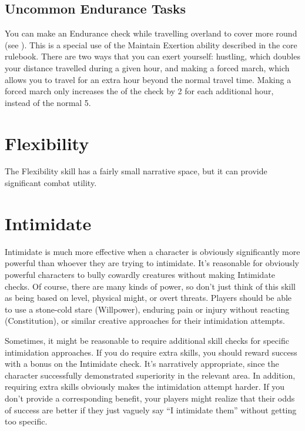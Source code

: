   \subsection{Uncommon Endurance Tasks}
     You can make an Endurance check while travelling overland to cover more round (see ).
    This is a special use of the Maintain Exertion ability described in the core rulebook.
    There are two ways that you can exert yourself: hustling, which doubles your distance travelled during a given hour, and making a forced march, which allows you to travel for an extra hour beyond the normal travel time.
    Making a forced march only increases the  of the check by 2 for each additional hour, instead of the normal 5.

\section{Flexibility}\label{Flexibility}

  The Flexibility skill has a fairly small narrative space, but it can provide significant combat utility.

\section{Intimidate}\label{Intimidate}

  Intimidate is much more effective when a character is obviously significantly more powerful than whoever they are trying to intimidate.
  It's reasonable for obviously powerful characters to bully cowardly creatures without making Intimidate checks.
  Of course, there are many kinds of power, so don't just think of this skill as being based on level, physical might, or overt threats.
  Players should be able to use a stone-cold stare (Willpower), enduring pain or injury without reacting (Constitution), or similar creative approaches for their intimidation attempts.

  Sometimes, it might be reasonable to require additional skill checks for specific intimidation approaches.
  If you do require extra skills, you should reward success with a bonus on the Intimidate check.
  It's narratively appropriate, since the character successfully demonstrated superiority in the relevant area.
  In addition, requiring extra skills obviously makes the intimidation attempt harder.
  If you don't provide a corresponding benefit, your players might realize that their odds of success are better if they just vaguely say ``I intimidate them'' without getting too specific.

